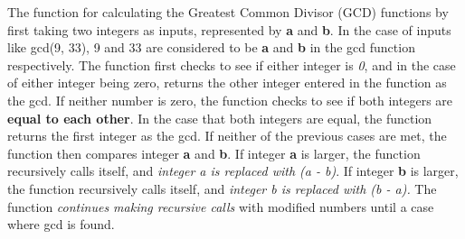 \documentclass{article}
\theoremstyle{theorem}
\theoremstyle{definition}
\theoremstyle{remark}
\begin{document}
    The function for calculating the Greatest Common Divisor (GCD) functions by first taking two integers as inputs, represented by \textbf{a} and \textbf{b}. In the case of inputs like gcd(9, 33), 9 and 33 are considered to be \textbf{a} and \textbf{b} in the gcd function respectively. The function first checks to see if either integer is \textit{0}, and in the case of either integer being zero, returns the other integer entered in the function as the gcd. If neither number is zero, the function checks to see if both integers are \textbf{equal to each other}. In the case that both integers are equal, the function returns the first integer as the gcd. If neither of the previous cases are met, the function then compares integer \textbf{a} and \textbf{b}. If integer \textbf{a} is larger, the function recursively calls itself, and \textit{integer a is replaced with (a - b)}. If integer \textbf{b} is larger, the function recursively calls itself, and \textit{integer b is replaced with (b - a).} The function \textit{continues making recursive calls} with modified numbers until a case where gcd is found.
\end{document}
